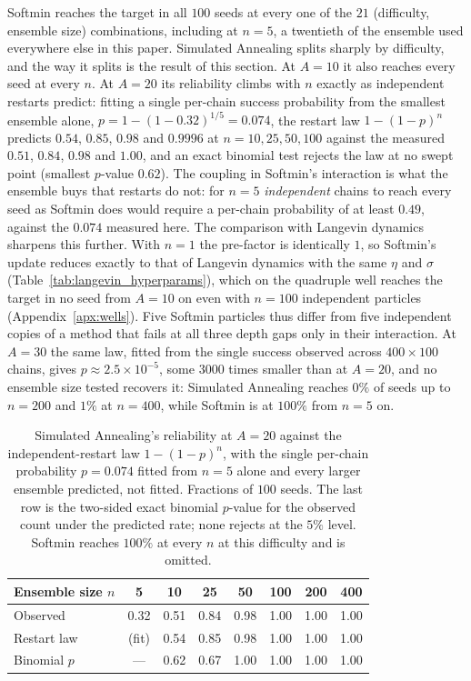 \documentclass{article}
\theoremstyle{plain}
\theoremstyle{definition}
\theoremstyle{remark}
\begin{document}
Softmin reaches the target in all $100$ seeds at every one of the $21$ (difficulty, ensemble size)
combinations, including at $n=5$, a twentieth of the ensemble used everywhere else in this paper.
Simulated Annealing splits sharply by difficulty, and the way it splits is the result of this
section. At $A=10$ it also reaches every seed at every $n$. At $A=20$ its reliability climbs with
$n$ exactly as independent restarts predict: fitting a single per-chain success probability from
the smallest ensemble alone, $p=1-(1-0.32)^{1/5}=0.074$, the restart law $1-(1-p)^n$ predicts
$0.54$, $0.85$, $0.98$ and $0.9996$ at $n=10,25,50,100$ against the measured $0.51$, $0.84$,
$0.98$ and $1.00$, and an exact binomial test rejects the law at no swept point (smallest
$p$-value $0.62$). The coupling in Softmin's interaction is what the ensemble buys that restarts
do not: for $n=5$ \emph{independent} chains to reach every seed as Softmin does would require a
per-chain probability of at least $0.49$, against the $0.074$ measured here. The comparison with
Langevin dynamics sharpens this further. With $n=1$ the pre-factor is identically $1$, so Softmin's
update reduces exactly to that of Langevin dynamics with the same $\eta$ and $\sigma$
(Table~\ref{tab:langevin_hyperparams}), which on the quadruple well reaches the target in no seed from
$A=10$ on even with $n=100$ independent particles (Appendix~\ref{apx:wells}). Five Softmin particles
thus differ from five independent copies of a method that fails at all three depth gaps only in their
interaction. At $A=30$ the same
law, fitted from the single success observed across $400\times100$ chains, gives
$p\approx2.5\times10^{-5}$, some $3000$ times smaller than at $A=20$, and no ensemble size tested
recovers it: Simulated Annealing reaches $0\%$ of seeds up to $n=200$ and $1\%$ at $n=400$, while
Softmin is at $100\%$ from $n=5$ on.

\begin{table}[!htbp]
  \centering
  \caption{Simulated Annealing's reliability at $A=20$ against the independent-restart law
  $1-(1-p)^n$, with the single per-chain probability $p=0.074$ fitted from $n=5$ alone and every
  larger ensemble predicted, not fitted. Fractions of $100$ seeds. The last row is the two-sided
  exact binomial $p$-value for the observed count under the predicted rate; none rejects at the
  $5\%$ level. Softmin reaches $100\%$ at every $n$ at this difficulty and is omitted.}
  \label{tab:restart_law}
  \begin{tabular}{lccccccc}
    \toprule
    Ensemble size $n$ & 5 & 10 & 25 & 50 & 100 & 200 & 400 \\
    \midrule
    Observed          & 0.32 & 0.51 & 0.84 & 0.98 & 1.00 & 1.00 & 1.00 \\
    Restart law       & (fit) & 0.54 & 0.85 & 0.98 & 1.00 & 1.00 & 1.00 \\
    Binomial $p$      & --- & 0.62 & 0.67 & 1.00 & 1.00 & 1.00 & 1.00 \\
    \bottomrule
  \end{tabular}
\end{table}
\end{document}
